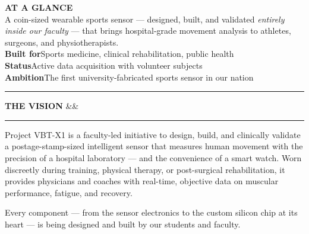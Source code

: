 \documentclass[a4paper,10pt]{article}
\newcommand{\sectionhead}[2]{%
{\color{accentGold}\rule{12pt}{1.5pt}}\hspace{4pt}%
{\fontsize{11pt}{12pt}\selectfont\color{deepNavy}\bfseries\MakeUppercase{#1}}%
\ifx&#2&\else\hspace{6pt}{\color{midGray}\fontsize{8pt}{9pt}\selectfont #2}\fi
\vspace{4pt}\hrule height 0.3pt\vspace{6pt}}
\begin{document}
\begin{minipage}[t]{\paperwidth}
\hspace{14mm}%
\begin{minipage}[t]{0.55\textwidth}

\begin{tcolorbox}[
  enhanced, colback=deepNavy, colframe=deepNavy,
  boxrule=0pt, arc=2pt, left=10pt, right=10pt, top=8pt, bottom=8pt,
  width=\linewidth, before skip=0pt, after skip=6pt,
  borderline west={3pt}{0pt}{accentGold}
]
{\color{accentGold}\fontsize{8pt}{9pt}\selectfont\bfseries\MakeUppercase{At a Glance}}\\[3pt]
{\color{white}\fontsize{11pt}{14pt}\selectfont
A coin-sized wearable sports sensor --- designed, built, and validated
\emph{entirely inside our faculty} --- that brings hospital-grade movement
analysis to athletes, surgeons, and physiotherapists.}\\[5pt]
{\color{white!75}\fontsize{8.5pt}{11pt}\selectfont
\textbf{\color{accentGold}Built for}\hspace{6pt}Sports medicine,
clinical rehabilitation, public health\\
\textbf{\color{accentGold}Status}\hspace{18pt}Active data acquisition with
volunteer subjects\\
\textbf{\color{accentGold}Ambition}\hspace{11pt}The first university-fabricated
sports sensor in our nation}
\end{tcolorbox}
\vspace{4pt}

\sectionhead{The Vision}{}
{\fontsize{9pt}{12pt}\selectfont\color{darkText}\justifying
Project VBT-X1 is a faculty-led initiative to design, build, and clinically
validate a postage-stamp-sized intelligent sensor that measures human movement
with the precision of a hospital laboratory --- and the convenience of a
smart watch. Worn discreetly during training, physical therapy, or
post-surgical rehabilitation, it provides physicians and coaches with
real-time, objective data on muscular performance, fatigue, and recovery.
\par\vspace{4pt}
Every component --- from the sensor electronics to the custom silicon chip
at its heart --- is being designed and built by our students and faculty.
\par}
\vspace{6pt}


\end{minipage}
\end{minipage}
\end{document}
